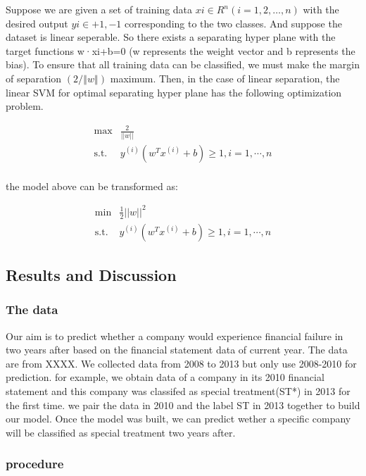 \documentclass[]{article}
\begin{document}
Suppose we are given a set of training data $xi \in R^n(i=1,2,…,n)$ with
the desired output $yi∈{+1,-1}$ corresponding to the two classes. And
suppose the dataset is linear seperable. So there exists a separating
hyper plane with the target functions w·xi+b=0 (w represents the weight
vector and b represents the bias). To ensure that all training data can
be classified, we must make the margin of separation $(2/‖w‖)$ maximum.
Then, in the case of linear separation, the linear SVM for optimal
separating hyper plane has the following optimization problem.

\[
\begin{aligned}\max & \frac{2}{||w||}\\
\text{s.t.} & y^{(i)}(w^{T}x^{(i)}+b)\geq1,i=1,\cdots,n\\
\end{aligned}
\]

the model above can be transformed as:

\[
\begin{aligned}\min & \frac{1}{2}||w||^{2}\\
\text{s.t.} & y^{(i)}(w^{T}x^{(i)}+b)\geq1,i=1,\cdots,n
\end{aligned}
\]

\subsection{Results and Discussion}\label{results-and-discussion}

\subsubsection{The data}\label{the-data}

Our aim is to predict whether a company would experience financial
failure in two years after based on the financial statement data of
current year. The data are from XXXX. We collected data from 2008 to
2013 but only use 2008-2010 for prediction. for example, we obtain data
of a company in its 2010 financial statement and this company was
classifed as special treatment(ST*) in 2013 for the first time. we pair
the data in 2010 and the label ST in 2013 together to build our model.
Once the model was built, we can predict wether a specific company will
be classified as special treatment two years after.

\subsubsection{procedure}\label{procedure}
\end{document}
